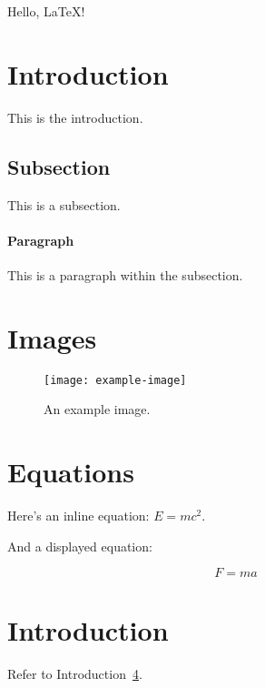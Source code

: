 \documentclass{article}
\begin{document}
Hello, LaTeX!

\section{Introduction}

This is the introduction.

\subsection{Subsection}

This is a subsection.

\paragraph{Paragraph}

This is a paragraph within the subsection.

\section{Images}

\begin{figure}
    \centering
    \texttt{[image: example-image]}
    \caption{An example image.}
    \label{fig:example}
\end{figure}

\section{Equations}

Here's an inline equation: $E=mc^2$.

And a displayed equation:

\begin{equation}
    F = ma
\end{equation}

\section{Introduction}
\label{sec:intro}

Refer to Introduction~\ref{sec:intro}.
\end{document}
